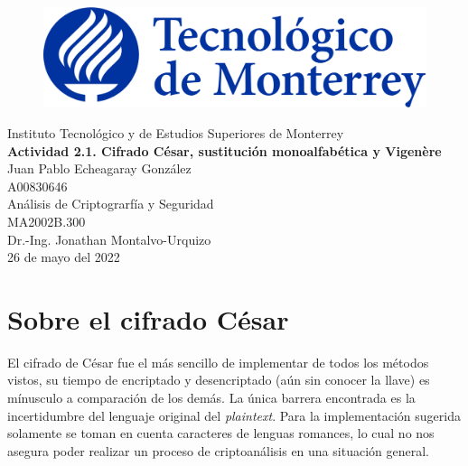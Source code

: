 \documentclass{article}
\begin{document}
    \begin{titlepage}
        \begin{center}
            \begin{figure}
                \centering
                \includegraphics[scale=0.13]{../../../logo_itesm.png}\\ %
            \end{figure}
        \vspace{5cm}
        \LARGE{Instituto Tecnológico y de Estudios Superiores de Monterrey}\\
        \fontsize{12}{14}\selectfont
        \vspace{1cm}
        \textbf{ Actividad 2.1. Cifrado César, sustitución monoalfabética y Vigenère} \\ %
        \vspace{0.7cm}
        Juan Pablo Echeagaray González \\ %
        \vspace{0.2cm}
        A00830646 \\ %
        \vspace{0.7cm}
        Análisis de Criptograrfía y Seguridad\\ %
        \vspace{0.2cm}
        MA2002B.300 \\ %
        \vspace{0.2cm}
        Dr.-Ing. Jonathan Montalvo-Urquizo \\ %
        \vspace{0.7cm}
        26 de mayo del 2022 \\ %
        \end{center}
    \end{titlepage}

    \section{Sobre el cifrado César}
        El cifrado de César fue el más sencillo de implementar de todos los métodos vistos, su tiempo de encriptado y desencriptado (aún sin conocer la llave) es mínusculo a comparación de los demás. La única barrera encontrada es la incertidumbre del lenguaje original del \emph{plaintext}. Para la implementación sugerida solamente se toman en cuenta caracteres de lenguas romances, lo cual no nos asegura poder realizar un proceso de criptoanálisis en una situación general.
\end{document}
